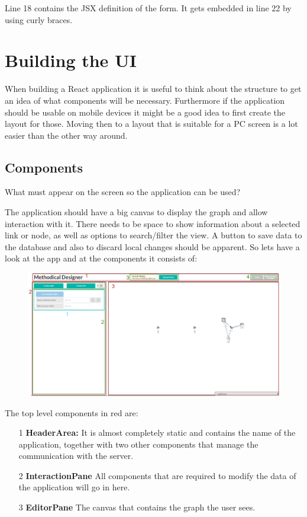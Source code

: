 Line 18 contains the JSX definition of the form. It gets embedded in line 22 by using curly braces.

\section{Building the UI}
When building a React application it is useful to think about the structure to get an idea of what components will be necessary. Furthermore if the application should be usable on mobile devices it might be a good idea to first create the layout for those. Moving then to a layout that is suitable for a PC screen is a lot easier than the other way around.

\subsection{Components}
What must appear on the screen so the application can be used?

The application should have a big canvas to display the graph and allow interaction with it. There needs to be space to show information about a selected link or node, as well as options to search/filter the view. A button to save data to the database and also to discard local changes should be apparent. So lets have a look at the app and at the components it consists of:
\begin{figure}[H]
\includegraphics[scale=.46]{Bilder/Layout.png}
\end{figure}
The top level components in red are:
\begin{itemize}
\item[1] \textbf{HeaderArea:} It is almost completely static and contains the name of the application, together with two other components that manage the communication with the server.
\item[2] \textbf{InteractionPane} All components that are required to modify the data of the application will go in here.
\item[3] \textbf{EditorPane} The canvas that contains the graph the user sees.
\end{itemize}

